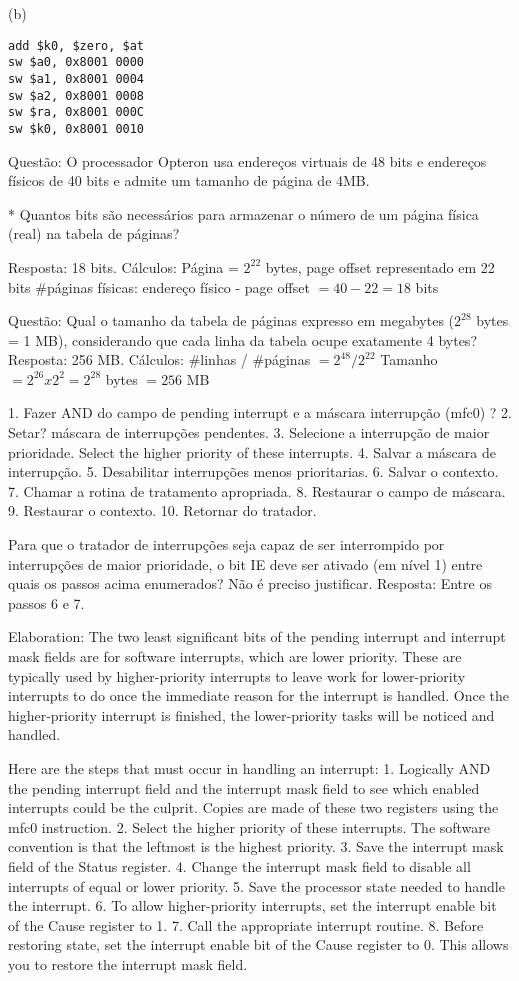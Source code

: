 \documentclass{article}
\begin{document}
(b)
\begin{verbatim}
add $k0, $zero, $at
sw $a0, 0x8001 0000
sw $a1, 0x8001 0004
sw $a2, 0x8001 0008
sw $ra, 0x8001 000C
sw $k0, 0x8001 0010
\end{verbatim}

Questão: O processador Opteron usa endereços virtuais de 48 bits e endereços
físicos de 40 bits e admite um tamanho de página de 4MB.

* Quantos bits são necessários para armazenar o número de um página física
(real) na tabela de páginas?

Resposta: 18 bits. Cálculos: Página = $2^{22}$ bytes, page offset representado
em 22 bits \#páginas físicas: endereço físico - page offset $= 40 - 22 = 18$
bits

Questão: Qual o tamanho da tabela de páginas expresso em megabytes ($2^{28}$
bytes = 1 MB), considerando que cada linha da tabela ocupe exatamente 4 bytes?
Resposta: 256 MB. Cálculos: \#linhas / \#páginas $= 2^{48} / 2^{22}$ Tamanho $=
2^{26} x 2^{2} = 2^{28}$ bytes $= 256$ MB

1. Fazer AND do campo de pending interrupt e a máscara interrupção (mfc0) ?
2. Setar? máscara de interrupções pendentes.
3. Selecione a interrupção de maior prioridade. Select the higher priority of
these interrupts.
4. Salvar a máscara de interrupção.
5. Desabilitar interrupções menos prioritarias.
6. Salvar o contexto.
7. Chamar a rotina de tratamento apropriada.
8. Restaurar o campo de máscara.
9. Restaurar o contexto.
10. Retornar do tratador.

Para que o tratador de interrupções seja capaz de ser interrompido por
interrupções de maior prioridade, o bit IE deve ser ativado (em nível 1) entre
quais os passos acima enumerados? Não é preciso justificar. Resposta: Entre os
passos 6 e 7.

Elaboration: The two least significant bits of the pending interrupt and
interrupt mask fields are for software interrupts, which are lower priority.
These are typically used by higher-priority interrupts to leave work for
lower-priority interrupts to do once the immediate reason for the interrupt is
handled. Once the higher-priority interrupt is finished, the lower-priority
tasks will be noticed and handled.

Here are the steps that must occur in handling an interrupt:
1. Logically AND the pending interrupt field and the interrupt mask field to
see which enabled interrupts could be the culprit. Copies are made of these two
registers using the mfc0 instruction.
2. Select the higher priority of these interrupts. The software convention is
that the leftmost is the highest priority.
3. Save the interrupt mask field of the Status register.
4. Change the interrupt mask field to disable all interrupts of equal or lower
priority.
5. Save the processor state needed to handle the interrupt.
6. To allow higher-priority interrupts, set the interrupt enable bit of the
Cause register to 1.
7. Call the appropriate interrupt routine.
8. Before restoring state, set the interrupt enable bit of the Cause register
to 0. This allows you to restore the interrupt mask field.
\end{document}
